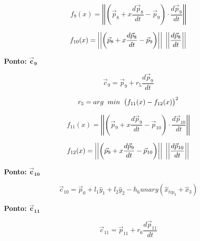 \documentclass[10pt,a4paper]{report}
\begin{document}
\begin{equation}
f_{9}(x) = \left| \left| \left( \vec{p}_{8} + x \frac{d \vec{p}_{8}}{dt} - \vec{p}_{9} \right) \cdot \frac{d \vec{p}_{9}}{dt} \right| \right|
\label{eq:f9}
\end{equation}

\begin{equation}
f_{10}(x) = \left| \left| \left( \vec{p}_{8} + x \frac{d \vec{p}_{8}}{dt} - \vec{p}_{9} \right) \right| \right| \hspace{0.1cm} \left| \left| \frac{d \vec{p}_{8}}{dt} \right| \right|
\label{eq:f10}
\end{equation}

\textbf{Ponto: {$\boldsymbol{\vec{c}_{9}}$}}

\begin{equation}
\vec{c}_{9} = \vec{p}_{9} + r_{5} \frac{d \vec{p}_{9}}{dt}
\label{eq:c9}
\end{equation}

\begin{equation}
r_{5} = arg \hspace{0.2cm} min \hspace{0.2cm} \big( f_{11}(x) - f_{12}(x) \big) ^{2}
\label{eq:r5}
\end{equation}

\begin{equation}
f_{11}(x) = \left| \left| \left( \vec{p}_{9} + x \frac{d \vec{p}_{9}}{dt} - \vec{p}_{10} \right) \cdot \frac{d \vec{p}_{10}}{dt} \right| \right|
\label{eq:f11}
\end{equation}

\begin{equation}
f_{12}(x) = \left| \left| \left( \vec{p}_{9} + x \frac{d \vec{p}_{9}}{dt} - \vec{p}_{10} \right) \right| \right| \hspace{0.1cm} \left| \left| \frac{d \vec{p}_{10}}{dt} \right| \right|
\label{eq:f12}
\end{equation}

\textbf{Ponto: {$\boldsymbol{\vec{c}_{10}}$}}

\begin{equation}
\vec{c}_{10} = \vec{p}_{0} + l_{1} \hat{y}_{1} + l_{2} \hat{y}_{2} - h_{6} unary(\hat{x}_{tip_{2}} + \hat{x}_{3})
\label{eq:c10}
\end{equation}

\textbf{Ponto: {$\boldsymbol{\vec{c}_{11}}$}}

\begin{equation}
\vec{c}_{11} = \vec{p}_{11} + r_{6} \frac{d \vec{p}_{11}}{dt}
\label{eq:c11}
\end{equation}
\end{document}
